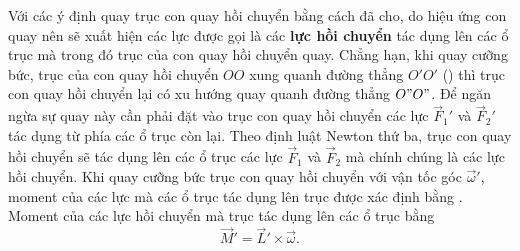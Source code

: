 Với các ý định quay trục con quay hồi chuyển bằng cách đã cho, do hiệu ứng con quay nên sẽ xuất hiện các lực được gọi là các \textbf{lực hồi chuyển} tác dụng lên các ổ trục mà trong đó trục của con quay hồi chuyển quay. Chẳng hạn, khi quay cưỡng bức, trục của con quay hồi chuyển $OO$ xung quanh đường thẳng $O'O'$ () thì trục con quay hồi chuyển lại có xu hướng quay quanh đường thẳng $O"O"$. Để ngăn ngừa sự quay này cần phải đặt vào trục con quay hồi chuyển các lực $\vec{F}_1'$ và $\vec{F}_2'$ tác dụng từ phía các ổ trục còn lại. Theo định luật Newton thứ ba, trục con quay hồi chuyển sẽ tác dụng lên các ổ trục các lực $\vec{F}_1$ và $\vec{F}_2$ mà chính chúng là các lực hồi chuyển. Khi quay cưỡng bức trục con quay hồi chuyển với vận tốc góc $\vec{\omega}'$, moment của các lực mà các ổ trục tác dụng lên trục được xác định bằng . Moment của các lực hồi chuyển mà trục tác dụng lên các ổ trục bằng
\begin{equation}\label{eq:5_70}
	\vec{M}' = \vec{L}' \times \vec{\omega}.
\end{equation}

